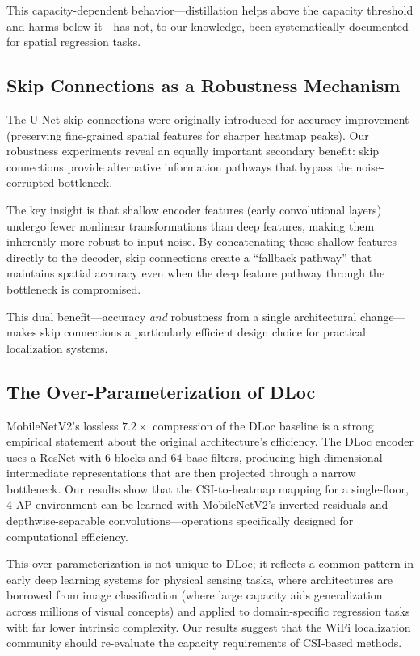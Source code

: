 \documentclass[11pt,a4paper]{article}
\begin{document}
This capacity-dependent behavior---distillation helps above the capacity threshold and harms below it---has not, to our knowledge, been systematically documented for spatial regression tasks.

\subsection{Skip Connections as a Robustness Mechanism}

The U-Net skip connections were originally introduced for accuracy improvement (preserving fine-grained spatial features for sharper heatmap peaks).
Our robustness experiments reveal an equally important secondary benefit: skip connections provide alternative information pathways that bypass the noise-corrupted bottleneck.

The key insight is that shallow encoder features (early convolutional layers) undergo fewer nonlinear transformations than deep features, making them inherently more robust to input noise.
By concatenating these shallow features directly to the decoder, skip connections create a ``fallback pathway'' that maintains spatial accuracy even when the deep feature pathway through the bottleneck is compromised.

This dual benefit---accuracy \emph{and} robustness from a single architectural change---makes skip connections a particularly efficient design choice for practical localization systems.

\subsection{The Over-Parameterization of DLoc}

MobileNetV2's lossless $7.2\times$ compression of the DLoc baseline is a strong empirical statement about the original architecture's efficiency.
The DLoc encoder uses a ResNet with 6 blocks and 64 base filters, producing high-dimensional intermediate representations that are then projected through a narrow bottleneck.
Our results show that the CSI-to-heatmap mapping for a single-floor, 4-AP environment can be learned with MobileNetV2's inverted residuals and depthwise-separable convolutions---operations specifically designed for computational efficiency.

This over-parameterization is not unique to DLoc; it reflects a common pattern in early deep learning systems for physical sensing tasks, where architectures are borrowed from image classification (where large capacity aids generalization across millions of visual concepts) and applied to domain-specific regression tasks with far lower intrinsic complexity.
Our results suggest that the WiFi localization community should re-evaluate the capacity requirements of CSI-based methods.
\end{document}
